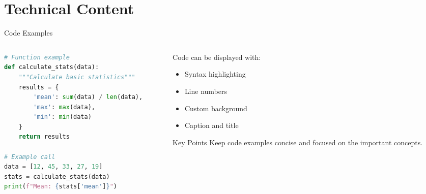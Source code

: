 \documentclass[aspectratio=169]{beamer}
\begin{document}
\section{Technical Content}

\begin{frame}[fragile]{Code Examples}
  \begin{columns}
    \begin{column}{0.48\textwidth}
      \begin{lstlisting}[language=Python, caption=Sample Python code]
# Function example
def calculate_stats(data):
    """Calculate basic statistics"""
    results = {
        'mean': sum(data) / len(data),
        'max': max(data),
        'min': min(data)
    }
    return results
    
# Example call
data = [12, 45, 33, 27, 19]
stats = calculate_stats(data)
print(f"Mean: {stats['mean']}")
      \end{lstlisting}
    \end{column}
    
    \begin{column}{0.48\textwidth}
      Code can be displayed with:
      \begin{itemize}
        \item Syntax highlighting
        \item Line numbers
        \item Custom background
        \item Caption and title
      \end{itemize}
      
      \begin{block}{Key Points}
        Keep code examples concise and focused on the important concepts.
      \end{block}
    \end{column}
  \end{columns}
\end{frame}
\end{document}
